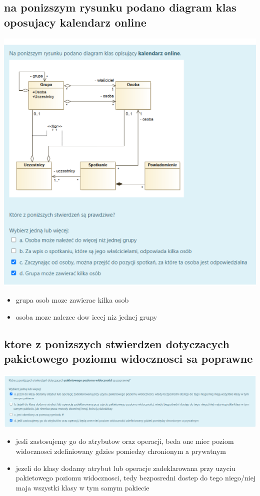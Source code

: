 \documentclass[11pt]{article}
\begin{document}
\subsection{na ponizszym rysunku podano diagram klas oposujacy kalendarz online}
\label{sec:org82626b3}
\begin{center}
\includegraphics[width=.9\linewidth]{./zadanie6.png}
\end{center}
\begin{itemize}
\item grupa osob moze zawierac kilka osob
\item osoba moze nalezec dow iecej niz jednej grupy
\end{itemize}
\subsection{ktore z ponizszych stwierdzen dotyczacych pakietowego poziomu widocznosci sa poprawne}
\label{sec:org81b1032}
\begin{center}
\includegraphics[width=.9\linewidth]{./zadanie7.png}
\end{center}
\begin{itemize}
\item jesli zastosujemy go do atrybutow oraz operacji, beda one miec poziom widocznosci zdefiniowany gdzies pomiedzy chronionym a prywatnym
\item jezeli do klasy dodamy atrybut lub operacje zadeklarowana przy uzyciu pakietowego poziomu widocznosci, tedy bezposredni dostep do tego niego/niej maja wszystki klasy w tym samym pakiecie
\end{itemize}
\end{document}
